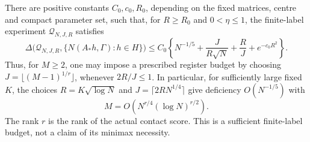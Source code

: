 \begin{theorem}\label{thm:v6-a2-budget}
There are positive constants $C_0,c_0,R_0$, depending on the fixed
matrices, centre and compact parameter set, such that, for $R\ge R_0$
and $0<\eta\le1$, the finite-label experiment $\mathcal Q_{N,J,R}$
satisfies
\begin{equation}
 \Delta\bigl(\mathcal Q_{N,J,R},\{N(A_*h,\Gamma):h\in H\}\bigr)
 \le C_0\left\{N^{-1/5}+\frac{J}{R\sqrt N}
                         +\frac RJ+e^{-c_0R^2}\right\}.
                                                        \label{eq:v6-a2-budget}
\end{equation}
Thus, for $M\ge2$, one may impose a prescribed register budget by
choosing $J=\lfloor(M-1)^{1/r}\rfloor$, whenever $2R/J\le1$. In particular, for sufficiently large
fixed $K$, the choices $R=K\sqrt{\log N}$ and
$J=\lceil2RN^{1/4}\rceil$ give deficiency $O(N^{-1/5})$ with
\begin{equation}
                  M=O(N^{r/4}(\log N)^{r/2}).           \label{eq:v6-a2-count}
\end{equation}
The rank $r$ is the rank of the actual contact score. This is a
sufficient finite-label budget, not a claim of its minimax necessity.
\end{theorem}
